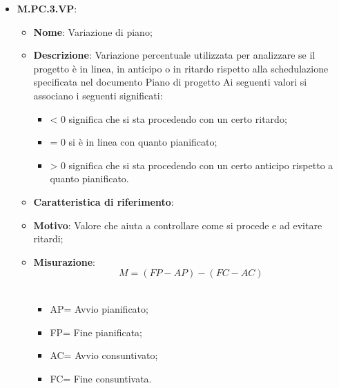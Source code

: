 \documentclass[10pt, a4paper]{article}
\begin{document}
\begin{itemize}
    
    \item \textbf{M.PC.3.VP}:
    \begin{itemize}
        \item \textbf{Nome}: Variazione di piano;
        \item \textbf{Descrizione}: Variazione percentuale utilizzata per analizzare se il progetto è in linea, in anticipo o in ritardo rispetto alla schedulazione specificata nel documento Piano di progetto  Ai seguenti valori si associano i seguenti significati:
        \begin{itemize}
            \item < 0 significa che si sta procedendo con un certo ritardo;
            \item = 0 si è in linea con quanto pianificato;
            \item > 0 significa che si sta procedendo con un certo anticipo rispetto a quanto pianificato.
        \end{itemize}
        \item \textbf{Caratteristica di riferimento}:
        \item \textbf{Motivo}: Valore che aiuta a controllare come si procede e ad evitare ritardi;
        \item \textbf{Misurazione}: \  \[ M=(FP-AP)-(FC-AC) \] \\
        \begin{itemize}
        \item AP= Avvio pianificato;
        \item FP= Fine pianificata;
        \item AC= Avvio consuntivato;
        \item FC= Fine consuntivata.\\
        \end{itemize}
    \end{itemize}


\end{itemize}
\end{document}
